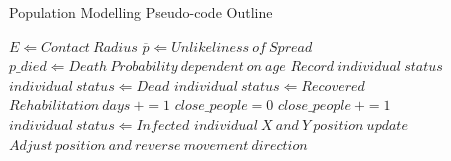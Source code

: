\begin{appendices}
\begin{algorithm}
\caption{Population Modelling Pseudo-code Outline}
\label{alg1}
\begin{algorithmic}[1]
  \STATE $E \Leftarrow Contact\:Radius$
  \STATE $\overline{p} \Leftarrow Unlikeliness\:of\:Spread$
  \STATE $p\_died \Leftarrow Death\:Probability\:dependent\:on\:age$
      \STATE$Record\:individual\:status$
        \STATE $individual\:status \Leftarrow Dead$
      \ELSE
          \STATE $individual\:status \Leftarrow Recovered$
        \ENDIF
        \STATE $Rehabilitation\:days\:+= 1$
      \ENDIF
        \STATE $close\_people = 0$
        \STATE $close\_people\:+= 1$
        \ENDIF
        \ENDFOR
          \STATE $individual\:status \Leftarrow Infected$
        \ENDIF
      \ENDIF
          \STATE $individual\:X\:and\:Y\:position\:update$
            \STATE $Adjust\:position\:and\:reverse\:movement\:direction$
          \ENDIF
      \ENDIF
  \ENDFOR
\ENDFOR
\end{algorithmic}
\end{algorithm}

\clearpage


\end{appendices}
